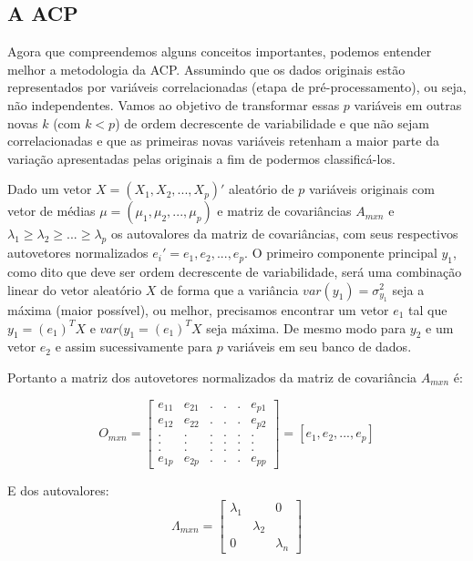 \documentclass[
]{book}
\begin{document}
\hypertarget{a-acp}{%
\subsection{A ACP}\label{a-acp}}

Agora que compreendemos alguns conceitos importantes, podemos entender melhor a metodologia da ACP. Assumindo que os dados originais estão representados por variáveis correlacionadas (etapa de pré-processamento), ou seja, não independentes. Vamos ao objetivo de transformar essas \(p\) variáveis em outras novas \(k\) (com \(k<p\)) de ordem decrescente de variabilidade e que não sejam correlacionadas e que as primeiras novas variáveis retenham a maior parte da variação apresentadas pelas originais a fim de podermos classificá-los.

Dado um vetor \(X=(X_1,X_2,..., X_p)'\) aleatório de \(p\) variáveis originais com vetor de médias \(\mu=(\mu_1,\mu_2,...,\mu_p)\) e matriz de covariâncias \(A_{mxn}\) e \(\lambda_1\geq\lambda_2\geq...\geq\lambda_p\) os autovalores da matriz de covariâncias, com seus respectivos autovetores normalizados \(e_i'=e_1,e_2,...,e_p\). O primeiro componente principal \(y_1\), como dito que deve ser ordem decrescente de variabilidade, será uma combinação linear do vetor aleatório \(X\) de forma que a variância \(var(y_1)=\sigma^2_{y_{1}}\) seja a máxima (maior possível), ou melhor, precisamos encontrar um vetor \(e_1\) tal que \(y_1=(e_1)^T X\) e \(var(y_1=(e_1)^T X\) seja máxima. De mesmo modo para \(y_2\) e um vetor \(e_2\) e assim sucessivamente para \(p\) variáveis em seu banco de dados.

Portanto a matriz dos autovetores normalizados da matriz de covariância \(A_{mxn}\) é:

\begin{equation}
    O_{mxn}= 
\begin{bmatrix}
e_{11} &e_{21}  &. &.  &. &e_{p1} \\ 
e_{12} &e_{22}  &. &.  &. &e_{p2} \\ 
.      &.       &. &.  &. &. \\ 
.      &.       &. &.  &. &. \\ 
.      &.       &. &.  &. &. \\ 
e_{1p} &e_{2p}  &. &.  &. &e_{pp} 
\end{bmatrix}
=[e_1,e_2,...,e_p]
\label{eq:autovetormatrix}
\end{equation}

E dos autovalores:
\begin{equation}
\Lambda_{mxn}=
\begin{bmatrix}
\lambda_1 & &0\\
& \lambda_2 & \\
0 & & \lambda_n
\label{eq:autovalormatrix}
\end{bmatrix}
\end{equation}
\end{document}
